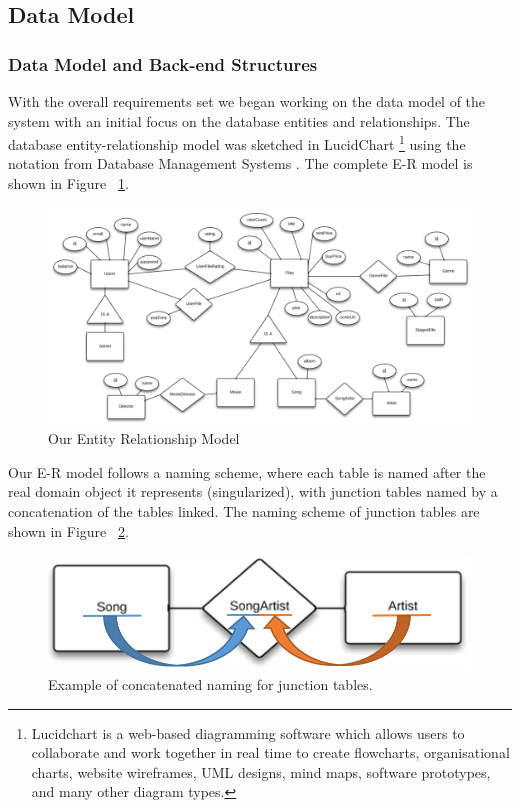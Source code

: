 \subsection{Data Model}
\subsubsection{Data Model and Back-end Structures}
\label{sec:datamodel}

With the overall requirements set we began working on the data model of the system with an initial focus on the database entities and relationships. The database entity-relationship model was sketched in LucidChart \footnote{Lucidchart is a web-based diagramming software which allows users to collaborate and work together in real time to create flowcharts, organisational charts, website wireframes, UML designs, mind maps, software prototypes, and many other diagram types.} using the notation from Database Management Systems \cite{dbbook}. The complete E-R  model is shown in Figure ~\ref{fig:erd}.

\begin{figure}[h!]
	\centering
	\includegraphics[scale=0.5]{./p1design/erdmodel.png}
	\caption{Our Entity Relationship Model}
	\label{fig:erd}
\end{figure}

Our E-R model follows a naming scheme, where each table is named after the real domain object it represents (singularized), with junction tables named by a concatenation of the tables linked. The naming scheme of junction tables are shown in Figure ~\ref{fig:junctionfigure}.


\begin{figure}[h!]
	\centering
	\includegraphics[scale=0.5]{./p1design/junctionfigure.png}
	\caption{Example of concatenated naming for junction tables.}
	\label{fig:junctionfigure}
\end{figure}


